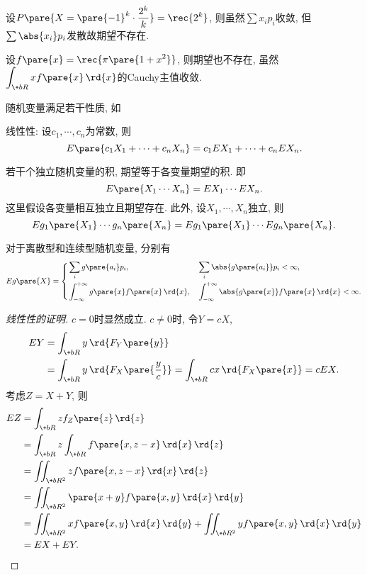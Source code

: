 \documentclass[../Statistics.tex]{subfiles}
\begin{document}
\begin{sample}
    \begin{ex}
        设$\displaystyle P\pare{X = \pare{-1}^k\cdot \frac{2^k}{k}} = \rec{2^k}$, 则虽然$\sum x_ip_i$收敛, 但$\sum \abs{x_i} p_i$发散故期望不存在.
    \end{ex}
    \begin{ex}
        设$f\pare{x} = \displaystyle \rec{\pi\pare{1+x^2}}$, 则期望也不存在, 虽然$\displaystyle \int_{\+bR} xf\pare{x}\,\rd{x}$的Cauchy主值收敛.
    \end{ex}
\end{sample}
随机变量满足若干性质, 如
\begin{cenum}
    \item 线性性: 设$c_1,\cdots,c_n$为常数, 则
    \[ E\pare{c_1X_1 + \cdots + c_nX_n} = c_1 EX_1 + \cdots + c_nEX_n. \]
    \item 若干个独立随机变量的积, 期望等于各变量期望的积. 即
    \[ E\pare{X_1\cdots X_n} = EX_1\cdots EX_n. \]
    这里假设各变量相互独立且期望存在. 此外, 设$X_1, \cdots, X_n$独立, 则
    \[ Eg_1\pare{X_1} \cdots g_n\pare{X_n} = Eg_1\pare{X_1}\cdots Eg_n\pare{X_n}. \]
    \item 对于离散型和连续型随机变量, 分别有
    \[ Eg\pare{X} = \left\{ \begin{aligned}
        & \sum_i g\pare{a_i}p_i, && \sum_i \abs{g\pare{a_i}}p_i < \infty, \\
        & \int_{-\infty}^{+\infty} g\pare{x}f\pare{x}\,\rd{x}, && \int_{-\infty}^{+\infty} \abs{g\pare{x}}f\pare{x}\,\rd{x} < \infty.
    \end{aligned}\right. \]
\end{cenum}
\begin{proof}[线性性的证明]
    $c=0$时显然成立. $c\neq 0$时, 令$Y=cX$,
    \begin{align*}
        EY &= \int_{\+bR} y\,\rd{F_Y\pare{y}} \\
        &= \int_{\+bR} y\,\rd{F_X\pare{\frac{y}{c}}} = \int_{\+bR} cx\,\rd{F_X\pare{x}} = cEX.
    \end{align*}
    考虑$Z = X+Y$, 则
    \begin{align*}
        EZ &= \int_{\+bR} zf_Z\pare{z}\,\rd{z} \\
        &= \int_{\+bR} z \int_{\+bR} f\pare{x,z-x}\,\rd{x}\,\rd{z} \\
        &= \iint_{\+bR^2} zf\pare{x,z-x}\,\rd{x}\,\rd{z} \\
        &= \iint_{\+bR^2} \pare{x+y} f\pare{x,y}\,\rd{x}\,\rd{y} \\
        &= \iint_{\+bR^2} xf\pare{x,y}\,\rd{x}\,\rd{y} + \iint_{\+bR^2} yf\pare{x,y}\,\rd{x}\,\rd{y} \\
        &= EX + EY. \qedhere
    \end{align*}
\end{proof}
\end{document}
